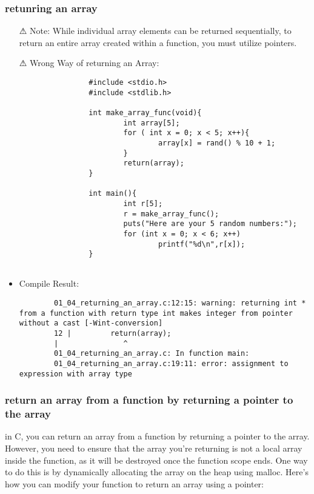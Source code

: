\subsubsection{retunring an array}
\begin{itemize}
        \item[⚠] \hspace{0.1cm} Note: While individual array elements can be returned sequentially,
         to return an entire array created within a function, you must utilize pointers.
        \end{itemize}
        
        
        \begin{itemize}
        \item[⚠] \hspace{0.1cm} Wrong Way of returning an Array:
        \begin{lstlisting}
                #include <stdio.h>
                #include <stdlib.h>

                int make_array_func(void){
                        int array[5];
                        for ( int x = 0; x < 5; x++){
                                array[x] = rand() % 10 + 1;
                        }
                        return(array);
                }

                int main(){
                        int r[5];
                        r = make_array_func();
                        puts("Here are your 5 random numbers:");
                        for (int x = 0; x < 6; x++)
                                printf("%d\n",r[x]);
                }
        
        \end{lstlisting}
        \item Compile Result:
        \begin{lstlisting}
        01_04_returning_an_array.c:12:15: warning: returning int * from a function with return type int makes integer from pointer without a cast [-Wint-conversion]
        12 |         return(array);
        |               ^
        01_04_returning_an_array.c: In function main:
        01_04_returning_an_array.c:19:11: error: assignment to expression with array type
        \end{lstlisting}
        \end{itemize}

\subsubsection{return an array from a function by returning a pointer to the array}
in C, you can return an array from a function by returning a pointer to the array.
However, you need to ensure that the array you’re returning is not a local array inside the function,
as it will be destroyed once the function scope ends. One way to do this is by dynamically allocating the
array on the heap using malloc. Here’s how you can modify your function to return an array using a pointer:

